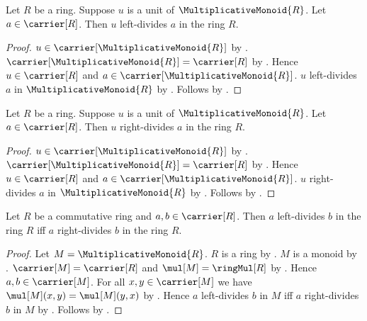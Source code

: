 \begin{theorem}\label{ring_unit_left_divides}
    Let $R$ be a ring.
    Suppose $u$ is a unit of $\MultiplicativeMonoid{R}$.
    Let $a\in\carrier[R]$.
    Then $u$ left-divides $a$ in the ring $R$.
\end{theorem}
\begin{proof}
    $u\in\carrier[\MultiplicativeMonoid{R}]$ by
        .
    $\carrier[\MultiplicativeMonoid{R}]=\carrier[R]$ by
        .
    Hence $u\in\carrier[R]$ and
        $a\in\carrier[\MultiplicativeMonoid{R}]$.
    $u$ left-divides $a$ in $\MultiplicativeMonoid{R}$ by
        .
    Follows by .
\end{proof}

\begin{theorem}\label{ring_unit_right_divides}
    Let $R$ be a ring.
    Suppose $u$ is a unit of $\MultiplicativeMonoid{R}$.
    Let $a\in\carrier[R]$.
    Then $u$ right-divides $a$ in the ring $R$.
\end{theorem}
\begin{proof}
    $u\in\carrier[\MultiplicativeMonoid{R}]$ by
        .
    $\carrier[\MultiplicativeMonoid{R}]=\carrier[R]$ by
        .
    Hence $u\in\carrier[R]$ and
        $a\in\carrier[\MultiplicativeMonoid{R}]$.
    $u$ right-divides $a$ in $\MultiplicativeMonoid{R}$ by
        .
    Follows by .
\end{proof}

\begin{theorem}\label{sided_ring_divisibility_equivalent}
    Let $R$ be a commutative ring and $a,b\in\carrier[R]$.
    Then $a$ left-divides $b$ in the ring $R$ iff
        $a$ right-divides $b$ in the ring $R$.
\end{theorem}
\begin{proof}
    Let $M=\MultiplicativeMonoid{R}$.
    $R$ is a ring by .
    $M$ is a monoid by .
    $\carrier[M]=\carrier[R]$ and $\mul[M]=\ringMul[R]$ by
        .
    Hence $a,b\in\carrier[M]$.
    For all $x,y\in\carrier[M]$ we have
        $\mul[M](x,y)=\mul[M](y,x)$ by
        .
    Hence $a$ left-divides $b$ in $M$ iff
        $a$ right-divides $b$ in $M$ by
        .
    Follows by
        .
\end{proof}

